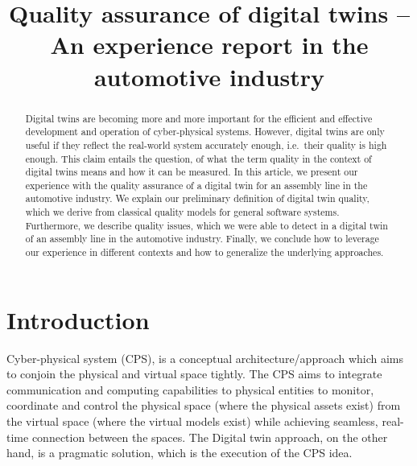 \documentclass[9pt,conference]{IEEEtran}
\begin{document}
    \title{Quality assurance of digital twins -- An experience report in the automotive industry}
    \author{
        \and
    }
    \maketitle

    \begin{abstract}
        Digital twins are becoming more and more important for the efficient and effective development and operation of cyber-physical systems.
        However, digital twins are only useful if they reflect the real-world system accurately enough, i.e.\ their quality is high enough.
        This claim entails the question, of what the term quality in the context of digital twins means and how it can be measured.
        In this article, we present our experience with the quality assurance of a digital twin for an assembly line in the automotive industry.
        We explain our preliminary definition of digital twin quality, which we derive from classical quality models for general software systems.
        Furthermore, we describe quality issues, which we were able to detect in a digital twin of an assembly line in the automotive industry.
        Finally, we conclude how to leverage our experience in different contexts and how to generalize the underlying approaches.
    \end{abstract}

    \section{Introduction}\label{section:introduction}
    Cyber-physical system (CPS), is a conceptual architecture/approach which aims to conjoin the physical and virtual space tightly. 
    The CPS aims to integrate communication and computing capabilities to physical entities to monitor, coordinate and control the physical space (where the physical assets exist) from the virtual space (where the virtual models exist) while achieving seamless, real-time connection between the spaces.
    The Digital twin approach, on the other hand, is a pragmatic solution, which is the execution of the CPS idea.~\cite{TAOCHAPTER1}
    
\end{document}
